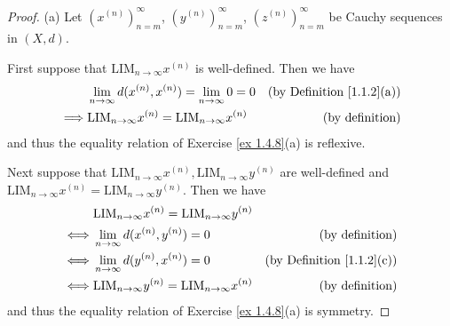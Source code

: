 \begin{proof}{(a)}
    Let \((x^{(n)})_{n = m}^\infty\), \((y^{(n)})_{n = m}^\infty\), \((z^{(n)})_{n = m}^\infty\) be Cauchy sequences in \((X, d)\).

    First suppose that \(\text{LIM}_{n \to \infty} x^{(n)}\) is well-defined.
    Then we have
    \begin{align*}
                 & \lim_{n \to \infty} d(x^{(n)}, x^{(n)}) = \lim_{n \to \infty} 0 = 0   & \text{(by Definition \ref{1.1.2}(a))} \\
        \implies & \text{LIM}_{n \to \infty} x^{(n)} = \text{LIM}_{n \to \infty} x^{(n)} & \text{(by definition)}
    \end{align*}
    and thus the equality relation of Exercise \ref{ex 1.4.8}(a) is reflexive.

    Next suppose that \(\text{LIM}_{n \to \infty} x^{(n)}, \text{LIM}_{n \to \infty} y^{(n)}\) are well-defined and \(\text{LIM}_{n \to \infty} x^{(n)} = \text{LIM}_{n \to \infty} y^{(n)}\).
    Then we have
    \begin{align*}
             & \text{LIM}_{n \to \infty} x^{(n)} = \text{LIM}_{n \to \infty} y^{(n)}                                         \\
        \iff & \lim_{n \to \infty} d(x^{(n)}, y^{(n)}) = 0                           & \text{(by definition)}                \\
        \iff & \lim_{n \to \infty} d(y^{(n)}, x^{(n)}) = 0                           & \text{(by Definition \ref{1.1.2}(c))} \\
        \iff & \text{LIM}_{n \to \infty} y^{(n)} = \text{LIM}_{n \to \infty} x^{(n)} & \text{(by definition)}
    \end{align*}
    and thus the equality relation of Exercise \ref{ex 1.4.8}(a) is symmetry.


\end{proof}
